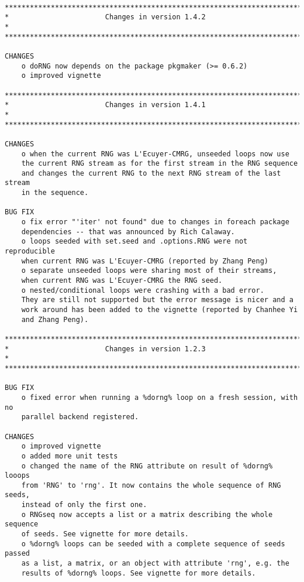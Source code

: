 \documentclass[a4paper,12pt]{article}\usepackage{graphicx, color}
\begin{document}
{\scriptsize
\begin{verbatim}

*************************************************************************
*                       Changes in version 1.4.2                        *
*************************************************************************

CHANGES
    o doRNG now depends on the package pkgmaker (>= 0.6.2)
    o improved vignette

*************************************************************************
*                       Changes in version 1.4.1                        *
*************************************************************************

CHANGES
    o when the current RNG was L'Ecuyer-CMRG, unseeded loops now use 
    the current RNG stream as for the first stream in the RNG sequence 
    and changes the current RNG to the next RNG stream of the last stream 
    in the sequence. 

BUG FIX
    o fix error "'iter' not found" due to changes in foreach package 
    dependencies -- that was announced by Rich Calaway.
    o loops seeded with set.seed and .options.RNG were not reproducible
    when current RNG was L'Ecuyer-CMRG (reported by Zhang Peng)
    o separate unseeded loops were sharing most of their streams, 
    when current RNG was L'Ecuyer-CMRG the RNG seed.
    o nested/conditional loops were crashing with a bad error. 
    They are still not supported but the error message is nicer and a 
    work around has been added to the vignette (reported by Chanhee Yi 
    and Zhang Peng).

*************************************************************************
*                       Changes in version 1.2.3                        *
*************************************************************************

BUG FIX
    o fixed error when running a %dorng% loop on a fresh session, with no  
    parallel backend registered.  

CHANGES
    o improved vignette
    o added more unit tests
    o changed the name of the RNG attribute on result of %dorng% looops 
    from 'RNG' to 'rng'. It now contains the whole sequence of RNG seeds, 
    instead of only the first one.
    o RNGseq now accepts a list or a matrix describing the whole sequence 
    of seeds. See vignette for more details.
    o %dorng% loops can be seeded with a complete sequence of seeds passed 
    as a list, a matrix, or an object with attribute 'rng', e.g. the 
    results of %dorng% loops. See vignette for more details.
    

\end{verbatim}}
\end{document}
